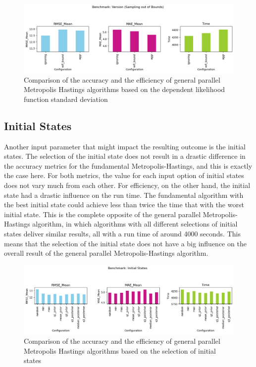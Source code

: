 \begin{figure}[H]
    \centering
    \includegraphics[width=1\textwidth]{figures/gpmh/sotb.png}
    \captionsetup{width=.8\textwidth}
    \caption{Comparison of the accuracy and the efficiency of general parallel Metropolis Hastings algorithms based on the dependent likelihood function standard deviation}
    \label{fig:enter-label}
\end{figure}

\subsection{Initial States}
Another input parameter that might impact the resulting outcome is the initial states. The selection of the initial state does not result in a drastic difference in the accuracy metrics for the fundamental Metropolis-Hastings, and this is exactly the case here. For both metrics, the value for each input option of initial states does not vary much from each other. For efficiency, on the other hand, the initial state had a drastic influence on the run time. The fundamental algorithm with the best initial state could achieve less than twice the time that with the worst initial state. This is the complete opposite of the general parallel Metropolis-Hastings algorithm, in which algorithms with all different selections of initial states deliver similar results, all with a run time of around 4000 seconds. This means that the selection of the initial state does not have a big influence on the overall result of the general parallel Metropolis-Hastings algorithm. 

\begin{figure}[H]
    \centering
    \includegraphics[width=1\textwidth]{figures/gpmh/init_states.png}
    \captionsetup{width=.8\textwidth}
    \caption{Comparison of the accuracy and the efficiency of general parallel Metropolis Hastings algorithms based on the selection of initial states}
    \label{fig:enter-label}
\end{figure}

